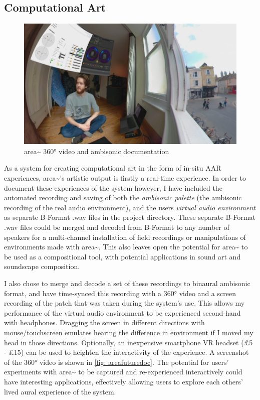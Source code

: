 \subsection{Computational Art}                  \label{sec: area-discussion-computationalart}
\begin{figure}
    \centering
    \includegraphics{figures/05-area/areafuturedoc.png}
    \caption{area\textasciitilde{} 360° video and ambisonic documentation \citep{bilbow2020}}
    \label{fig: areafuturedoc}
\end{figure}
As a system for creating computational art in the form of in-situ AAR experiences, area\textasciitilde{}’s artistic output is firstly a real-time experience. In order to document these experiences of the system however, I have included the automated recording and saving of both the \textit{ambisonic palette} (the ambisonic recording of the real audio environment), and the users \textit{virtual audio environment} as separate B-Format .wav files in the project directory. These separate B-Format .wav files could be merged and decoded from B-Format to any number of speakers for a multi-channel installation of field recordings or manipulations of environments made with area\textasciitilde{}. This also leaves open the potential for area\textasciitilde{} to be used as a compositional tool, with potential applications in sound art and soundscape composition.

I also chose to merge and decode a set of these recordings to binaural ambisonic format, and have time-synced this recording with a 360° video and a screen recording of the patch that was taken during the system’s use. This allows my performance of the virtual audio environment to be experienced second-hand with headphones. Dragging the screen in different directions with mouse/touchscreen emulates hearing the difference in environment if I moved my head in those directions. Optionally, an inexpensive smartphone VR headset (£5 - £15) can be used to heighten the interactivity of the experience. A screenshot of the 360° video \citep{bilbow2020} is shown in \autoref{fig: areafuturedoc}. The potential for users’ experiments with area\textasciitilde{} to be captured and re-experienced interactively could have interesting applications, effectively allowing users to explore each others’ lived aural experience of the system.

